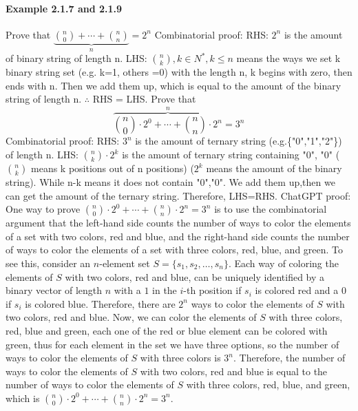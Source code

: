 \documentclass{article}
\begin{document}
\paragraph{Example 2.1.7 and 2.1.9}
Prove that $\underbrace{\binom{n}{0}+\cdots+\binom{n}{n}}_{n}=2^n$\newline
Combinatorial proof:\newline
RHS: $2^n$ is the amount of binary string of length n.\newline
LHS: $\binom{n}{k},k\in N^*, k\leq n$ means the ways we set k binary string set (e.g. k=1, others =0) with the length n, k begins with zero, then ends with n. \newline
Then we add them up, which is equal to the amount of the binary string of length n.\newline
$\therefore$ RHS = LHS.\newline
Prove that $$\overbrace{\binom{n}{0}\cdot 2^0 +\cdots +\binom{n}{n}\cdot 2^n}^{n}=3^n$$\newline
Combinatorial proof:\newline
RHS: $3^n$ is the amount of ternary string (e.g.\{"0","1","2"\}) of length n.\newline
LHS: $\binom{n}{k}\cdot 2^k$ is the amount of ternary string containing "0", "0" ($\binom{n}{k}$ means k positions out of n positions) ($2^k$ means the amount of the binary string). While n-k means it does not contain "0","0". We add them up,then we can get the amount of the ternary string.\newline
Therefore, LHS=RHS.\newline
ChatGPT proof:\newline
One way to prove $\binom{n}{0}\cdot 2^0 +\cdots +\binom{n}{n}\cdot 2^n = 3^n$ is to use the combinatorial argument that the left-hand side counts the number of ways to color the elements of a set with two colors, red and blue, and the right-hand side counts the number of ways to color the elements of a set with three colors, red, blue, and green.\newline
To see this, consider an $n$-element set $S = \{s_1, s_2, \dots, s_n\}$. Each way of coloring the elements of $S$ with two colors, red and blue, can be uniquely identified by a binary vector of length $n$ with a $1$ in the $i$-th position if $s_i$ is colored red and a $0$ if $s_i$ is colored blue.\newline
Therefore, there are $2^n$ ways to color the elements of $S$ with two colors, red and blue.\newline
Now, we can color the elements of $S$ with three colors, red, blue and green, each one of the red or blue element can be colored with green, thus for each element in the set we have three options, so the number of ways to color the elements of $S$ with three colors is $3^n$.\newline
Therefore, the number of ways to color the elements of $S$ with two colors, red and blue is equal to the number of ways to color the elements of $S$ with three colors, red, blue, and green, which is $\binom{n}{0}\cdot 2^0 +\cdots +\binom{n}{n}\cdot 2^n =3^n$.
\end{document}
